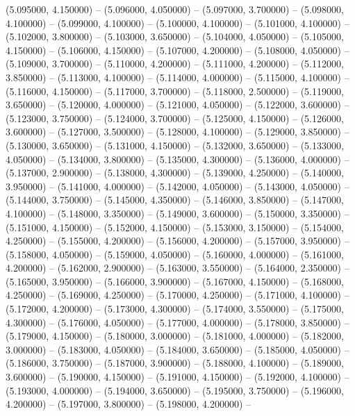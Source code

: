 (5.095000, 4.150000) -- 
(5.096000, 4.050000) -- 
(5.097000, 3.700000) -- 
(5.098000, 4.100000) -- 
(5.099000, 4.100000) -- 
(5.100000, 4.100000) -- 
(5.101000, 4.100000) -- 
(5.102000, 3.800000) -- 
(5.103000, 3.650000) -- 
(5.104000, 4.050000) -- 
(5.105000, 4.150000) -- 
(5.106000, 4.150000) -- 
(5.107000, 4.200000) -- 
(5.108000, 4.050000) -- 
(5.109000, 3.700000) -- 
(5.110000, 4.200000) -- 
(5.111000, 4.200000) -- 
(5.112000, 3.850000) -- 
(5.113000, 4.100000) -- 
(5.114000, 4.000000) -- 
(5.115000, 4.100000) -- 
(5.116000, 4.150000) -- 
(5.117000, 3.700000) -- 
(5.118000, 2.500000) -- 
(5.119000, 3.650000) -- 
(5.120000, 4.000000) -- 
(5.121000, 4.050000) -- 
(5.122000, 3.600000) -- 
(5.123000, 3.750000) -- 
(5.124000, 3.700000) -- 
(5.125000, 4.150000) -- 
(5.126000, 3.600000) -- 
(5.127000, 3.500000) -- 
(5.128000, 4.100000) -- 
(5.129000, 3.850000) -- 
(5.130000, 3.650000) -- 
(5.131000, 4.150000) -- 
(5.132000, 3.650000) -- 
(5.133000, 4.050000) -- 
(5.134000, 3.800000) -- 
(5.135000, 4.300000) -- 
(5.136000, 4.000000) -- 
(5.137000, 2.900000) -- 
(5.138000, 4.300000) -- 
(5.139000, 4.250000) -- 
(5.140000, 3.950000) -- 
(5.141000, 4.000000) -- 
(5.142000, 4.050000) -- 
(5.143000, 4.050000) -- 
(5.144000, 3.750000) -- 
(5.145000, 4.350000) -- 
(5.146000, 3.850000) -- 
(5.147000, 4.100000) -- 
(5.148000, 3.350000) -- 
(5.149000, 3.600000) -- 
(5.150000, 3.350000) -- 
(5.151000, 4.150000) -- 
(5.152000, 4.150000) -- 
(5.153000, 3.150000) -- 
(5.154000, 4.250000) -- 
(5.155000, 4.200000) -- 
(5.156000, 4.200000) -- 
(5.157000, 3.950000) -- 
(5.158000, 4.050000) -- 
(5.159000, 4.050000) -- 
(5.160000, 4.000000) -- 
(5.161000, 4.200000) -- 
(5.162000, 2.900000) -- 
(5.163000, 3.550000) -- 
(5.164000, 2.350000) -- 
(5.165000, 3.950000) -- 
(5.166000, 3.900000) -- 
(5.167000, 4.150000) -- 
(5.168000, 4.250000) -- 
(5.169000, 4.250000) -- 
(5.170000, 4.250000) -- 
(5.171000, 4.100000) -- 
(5.172000, 4.200000) -- 
(5.173000, 4.300000) -- 
(5.174000, 3.550000) -- 
(5.175000, 4.300000) -- 
(5.176000, 4.050000) -- 
(5.177000, 4.000000) -- 
(5.178000, 3.850000) -- 
(5.179000, 4.150000) -- 
(5.180000, 3.000000) -- 
(5.181000, 4.000000) -- 
(5.182000, 3.000000) -- 
(5.183000, 4.050000) -- 
(5.184000, 3.650000) -- 
(5.185000, 4.050000) -- 
(5.186000, 3.750000) -- 
(5.187000, 3.900000) -- 
(5.188000, 4.100000) -- 
(5.189000, 3.600000) -- 
(5.190000, 4.150000) -- 
(5.191000, 4.150000) -- 
(5.192000, 4.100000) -- 
(5.193000, 4.000000) -- 
(5.194000, 3.650000) -- 
(5.195000, 3.750000) -- 
(5.196000, 4.200000) -- 
(5.197000, 3.800000) -- 
(5.198000, 4.200000) -- 
